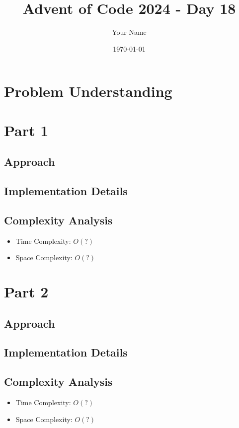 \documentclass{article}
\title{Advent of Code 2024 - Day 18}
\author{Your Name}
\date{\today}
\begin{document}
\maketitle

\section{Problem Understanding}

\section{Part 1}
\subsection{Approach}

\subsection{Implementation Details}

\subsection{Complexity Analysis}
\begin{itemize}
    \item Time Complexity: $O(?)$
    \item Space Complexity: $O(?)$
\end{itemize}

\section{Part 2}
\subsection{Approach}

\subsection{Implementation Details}

\subsection{Complexity Analysis}
\begin{itemize}
    \item Time Complexity: $O(?)$
    \item Space Complexity: $O(?)$
\end{itemize}
\end{document}
